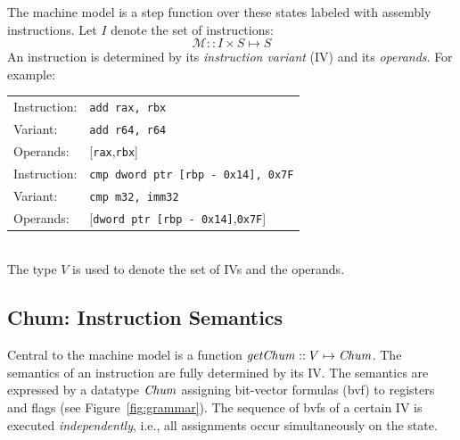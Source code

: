 The machine model is a step function over these states labeled with assembly instructions.
Let $I$ denote the set of instructions:
\[
	\mathcal{M} :: I \times S \mapsto S
\]
An instruction is determined by its \emph{instruction variant} (IV) and its \emph{operands}.
For example:\\
\begin{tabular}{ll}\hline
Instruction:  & \texttt{add rax, rbx} \\
Variant: & \texttt{add r64, r64} \\
Operands: & [\texttt{rax},\texttt{rbx}] \\\hline
Instruction: & \texttt{cmp	dword ptr [rbp - 0x14], 0x7F} \\
Variant:   	& \texttt{cmp m32, imm32} \\
Operands: &  [\texttt{dword ptr [rbp - 0x14]},\texttt{0x7F}] \\\hline
\end{tabular}\\
The type $V$ is used to denote the set of IVs and the operands.

\subsection{Chum: Instruction Semantics}\label{sec:machine_model}

Central to the machine model is a function $\mathit{getChum} :: V \mapsto \mathit{Chum}$.
The semantics of an instruction are fully determined by its IV.
The semantics are expressed by a datatype $\mathit{Chum}$ assigning bit-vector formulas (bvf) to registers and flags (see Figure~\ref{fig:grammar}).
The sequence of bvfs of a certain IV is executed \emph{independently}, i.e., all assignments occur simultaneously on the state.

